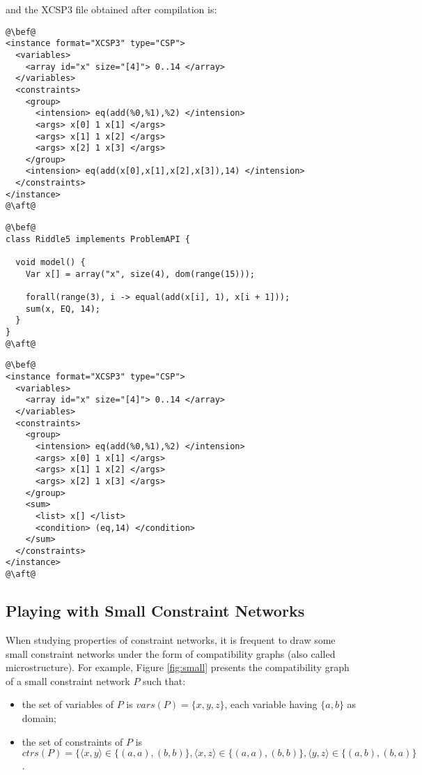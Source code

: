 \documentclass[10pt]{article}
\def\xt{{\rm XCSP3}\xspace}
\def\xt{{\rm XCSP3}\xspace}
\begin{document}
and the \xt file obtained after compilation is:

\begin{lstlisting}
@\bef@
<instance format="XCSP3" type="CSP">
  <variables>
    <array id="x" size="[4]"> 0..14 </array>
  </variables>
  <constraints>
    <group>
      <intension> eq(add(%0,%1),%2) </intension>
      <args> x[0] 1 x[1] </args>
      <args> x[1] 1 x[2] </args>
      <args> x[2] 1 x[3] </args>
    </group>
    <intension> eq(add(x[0],x[1],x[2],x[3]),14) </intension>
  </constraints>
</instance>
@\aft@
\end{lstlisting}


\begin{lstlisting}
@\bef@
class Riddle5 implements ProblemAPI {

  void model() {
    Var x[] = array("x", size(4), dom(range(15)));
    
    forall(range(3), i -> equal(add(x[i], 1), x[i + 1]));
    sum(x, EQ, 14);
  }
}
@\aft@
\end{lstlisting}

\begin{lstlisting}
@\bef@
<instance format="XCSP3" type="CSP">
  <variables>
    <array id="x" size="[4]"> 0..14 </array>
  </variables>
  <constraints>
    <group>
      <intension> eq(add(%0,%1),%2) </intension>
      <args> x[0] 1 x[1] </args>
      <args> x[1] 1 x[2] </args>
      <args> x[2] 1 x[3] </args>
    </group>
    <sum>
      <list> x[] </list>
      <condition> (eq,14) </condition>
    </sum>
  </constraints>
</instance>
@\aft@
\end{lstlisting}



\subsection{Playing with Small Constraint Networks}

When studying properties of constraint networks, it is frequent to draw some small constraint networks under the form of compatibility graphs (also called microstructure).
For example, Figure \ref{fig:small} presents the compatibility graph of a small constraint network $P$ such that:
\begin{itemize}
\item the set of variables of $P$ is $vars(P)=\{x,y,z\}$, each variable having $\{a,b\}$ as domain;
  \item the set of constraints of $P$ is $ctrs(P)= \{\langle x,y \rangle \in \{(a,a),(b,b)\}, \langle x,z \rangle \in \{(a,a),(b,b)\},\langle y,z \rangle \in \{(a,b),(b,a)\}$.
\end{itemize}
\end{document}
